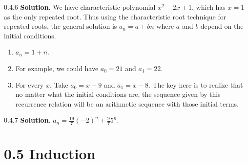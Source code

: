 \documentclass[11pt,]{book}
\theoremstyle{ptxplainnotitle}
\theoremstyle{ptxplaintitle}
\theoremstyle{ptxdefinitionnotitle}
\theoremstyle{ptxdefinitiontitle}
\theoremstyle{ptxdefinitionnotitle}
\theoremstyle{ptxdefinitiontitle}
\theoremstyle{ptxdefinitionnotitle}
\theoremstyle{ptxdefinitiontitle}
\theoremstyle{ptxdefinitiontitlenonumber}
\theoremstyle{ptxdefinitiontitlenonumber}
\numberwithin{equation}{chapter}
\begin{document}
\begin{divisionexercise}{0.4.6}
\textbf{Solution}.\quad%
\hypertarget{p-514}{}%
We have characteristic polynomial \(x^2 - 2x + 1\), which has \(x = 1\) as the only repeated root.  Thus using the characteristic root technique for repeated roots, the general solution is \(a_n = a + bn\) where \(a\) and \(b\) depend on the initial conditions. \leavevmode%
\begin{enumerate}[label=(\alph*)]
\item\hypertarget{li-234}{}\(a_n = 1 + n\).%
\item\hypertarget{li-235}{}\hypertarget{p-515}{}%
For example, we could have \(a_0 = 21\) and \(a_1 = 22\).%
\item\hypertarget{li-236}{}\hypertarget{p-516}{}%
For every \(x\).  Take \(a_0 = x-9\) and \(a_1 = x-8\).  The key here is to realize that no matter what the initial conditions are, the sequence given by this recurrence relation will be an arithmetic sequence with those initial terms.%
\end{enumerate}
%
\end{divisionexercise}%
\begin{divisionexercise}{0.4.7}
\textbf{Solution}.\quad%
\hypertarget{p-522}{}%
\(a_n = \frac{19}{7}(-2)^n + \frac{9}{7}5^n\text{.}\)%
\end{divisionexercise}%
\section*{0.5 Induction}
\end{document}
